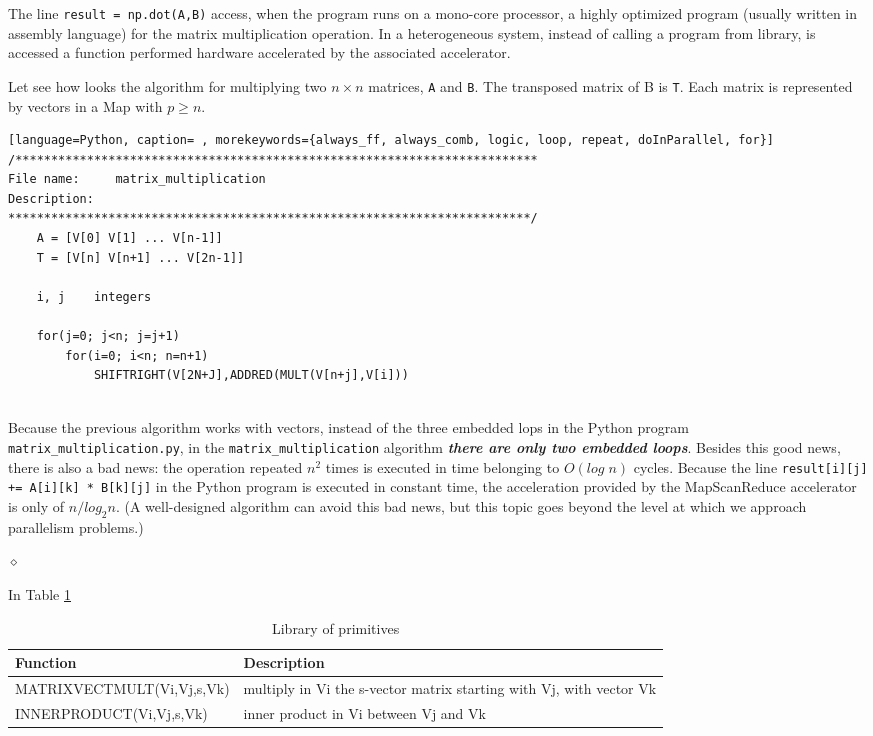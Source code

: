 The line {\tt result = np.dot(A,B)} access, when the program runs on a mono-core processor, a highly optimized program (usually written in assembly language) for the matrix multiplication operation. In a heterogeneous system, instead of calling a program from library, is accessed a function performed hardware accelerated by the associated accelerator.

\begin{exemplu}
Let see how looks the algorithm for multiplying two $n \times n$ matrices, {\tt A} and {\tt B}. The transposed matrix of B is {\tt T}. Each matrix is represented by vectors in a Map with $p\geq n$.

{\small
{\em 
\begin{shaded*}
\begin{lstlisting}[language=Python, caption= , morekeywords={always_ff, always_comb, logic, loop, repeat, doInParallel, for}]
/*************************************************************************
File name:     matrix_multiplication
Description:        
*************************************************************************/
    A = [V[0] V[1] ... V[n-1]]
    T = [V[n] V[n+1] ... V[2n-1]]
    
    i, j    integers
    
    for(j=0; j<n; j=j+1)
        for(i=0; i<n; n=n+1)
            SHIFTRIGHT(V[2N+J],ADDRED(MULT(V[n+j],V[i]))
    
\end{lstlisting}
\end{shaded*}
}}
Because the previous algorithm works with vectors, instead of the three embedded lops in the Python program {\tt matrix\_multiplication.py}, in the {\tt matrix\_multiplication} algorithm {\bf {\em there are only two embedded loops}}. Besides this good news, there is also a bad news: the operation repeated $n^2$ times is executed in time belonging to $O(log \; n)$ cycles. Because the line {\tt result[i][j] += A[i][k] * B[k][j]} in the Python program is executed in constant time, the acceleration provided by the MapScanReduce accelerator is only of $n/log_2 n$. (A well-designed algorithm can avoid this bad news, but this topic goes beyond the level at which we approach parallelism problems.)

$\diamond$
\end{exemplu}


In Table \ref{prim}

\begin{table}[h]
	\centering                       
	\caption{Library of primitives}           
	\label{prim}       %

	\begin{tabular}{|p{}|p{}|} \hline  %
		Function & Description  \\ \hline \hline
		MATRIXVECTMULT(Vi,Vj,s,Vk) & multiply in Vi the s-vector matrix starting with Vj, with vector Vk    \\ \hline
		INNERPRODUCT(Vi,Vj,s,Vk) & inner product in Vi between Vj and Vk  \\ \hline
	\end{tabular}

\end{table}



